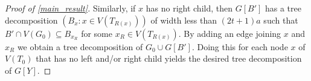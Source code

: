 \documentclass{patmorin}
\begin{document}
\begin{proof}[Proof of \cref{main_result}]
  Similarly, if $x$ has no right child, then $G[B']$ has a tree decomposition $(B_x:x\in V(T_{R(x)}))$ of width less than $(2t+1)a$ such that $B'\cap V(G_0) \subseteq B_{x_R}$ for some $x_R\in V(T_{R(x)})$.  By adding an edge joining $x$ and $x_R$ we obtain a tree decomposition of $G_0\cup G[B']$.  Doing this for each node $x$ of $V(T_0)$ that has no left and/or right child yields the desired tree decomposition of $G[Y]$.  
\end{proof}




\end{document}
